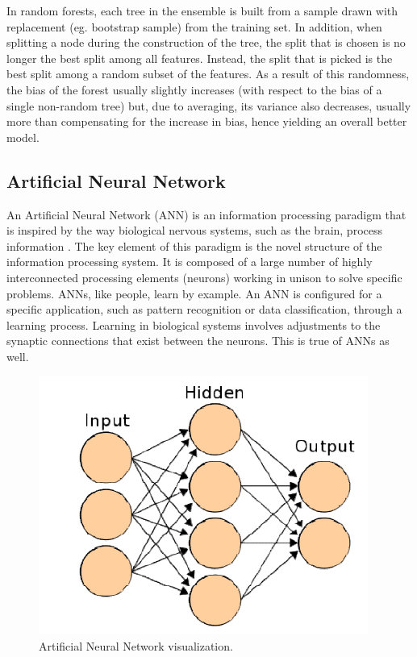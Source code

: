 \documentclass[journal]{IEEEtran}
\begin{document}
In random forests, each tree in the ensemble is built from a sample drawn with replacement (eg. bootstrap sample) from the training set. In addition, when splitting a node during the construction of the tree, the split that is chosen is no longer the best split among all features. Instead, the split that is picked is the best split among a random subset of the features. As a result of this randomness, the bias of the forest usually slightly increases (with respect to the bias of a single non-random tree) but, due to averaging, its variance also decreases, usually more than compensating for the increase in bias, hence yielding an overall better model.

\subsection{Artificial Neural Network}
An Artificial Neural Network (ANN) is an information processing paradigm that is inspired by the way biological nervous systems, such as the brain, process information \cite{Specht1990-nr}. The key element of this paradigm is the novel structure of the information processing system. It is composed of a large number of highly interconnected processing elements (neurons) working in unison to solve specific problems. ANNs, like people, learn by example. An ANN is configured for a specific application, such as pattern recognition or data classification, through a learning process. Learning in biological systems involves adjustments to the synaptic connections that exist between the neurons. This is true of ANNs as well.

\begin{figure}[!ht]
	\centering
	\includegraphics[scale=0.5]{ANN}
	\caption{Artificial Neural Network visualization.}
\end{figure}
\end{document}
